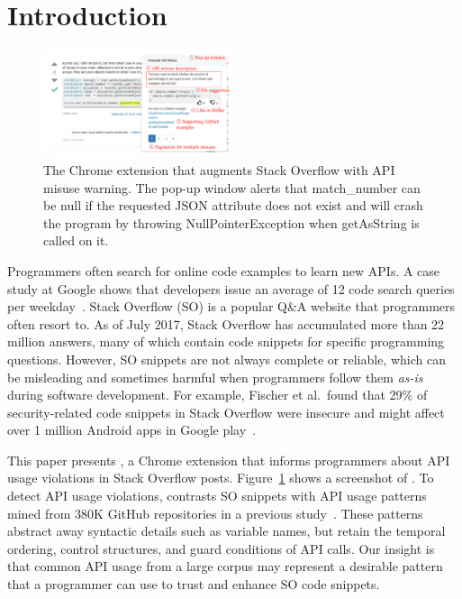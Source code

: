 \section{Introduction}
\label{sec:intro}

\begin{figure}
\centering
\includegraphics[width=0.5\textwidth]{soap-v4.pdf}
  \caption{The {\tool} Chrome extension that augments Stack Overflow with API misuse warning. The pop-up window alerts that {\ttt match\_number} can be {\ttt null} if the requested {\ttt JSON} attribute does not exist and will crash the program by throwing {\ttt NullPointerException} when {\ttt getAsString} is called on it.}
  \label{fig:screenshot}
  \vspace{-0.1in}
\end{figure}

Programmers often search for online code examples to learn new APIs. A case study at Google shows that developers issue an average of 12 code search queries per weekday~\cite{sadowski2015developers}. Stack Overflow (SO) is a popular Q\&A website that programmers often resort to. As of July 2017, Stack Overflow has accumulated more than 22 million answers, many of which contain code snippets for specific programming questions. However, SO snippets are not always complete or reliable, which can be misleading and sometimes harmful when programmers follow them {\em as-is} during software development. For example, Fischer et al.~found that 29\% of security-related code snippets in Stack Overflow were insecure and might affect over 1 million Android apps in Google play~\cite{fischer2017stack}. 

This paper presents {\tool}, a Chrome extension that informs programmers about API usage violations in Stack Overflow posts. Figure~\ref{fig:screenshot} shows a screenshot of {\tool}. To detect API usage violations, {\tool} contrasts SO snippets with API usage patterns mined from 380K GitHub repositories in a previous study~\cite{zhang2018code}. These patterns abstract away syntactic details such as variable names, but retain the temporal ordering, control structures, and guard conditions of API calls. Our insight is that common API usage from a large corpus may represent a desirable pattern that a programmer can use to trust and enhance SO code snippets. 


